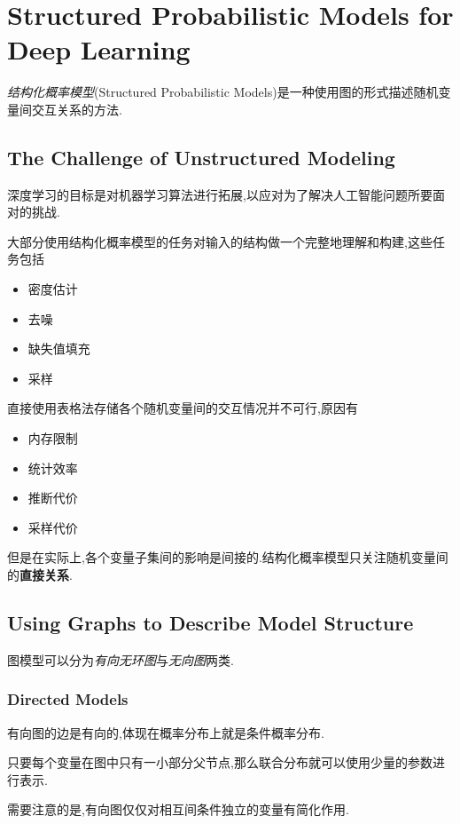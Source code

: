 \chapter{Structured Probabilistic Models for Deep Learning}

\textit{结构化概率模型}(Structured Probabilistic Models)是一种使用图的形式描述随机变量间交互关系的方法.

\section{The Challenge of Unstructured Modeling}

深度学习的目标是对机器学习算法进行拓展,以应对为了解决人工智能问题所要面对的挑战.

大部分使用结构化概率模型的任务对输入的结构做一个完整地理解和构建,这些任务包括
\begin{itemize}
    \item 密度估计
    \item 去噪
    \item 缺失值填充
    \item 采样
\end{itemize}

直接使用表格法存储各个随机变量间的交互情况并不可行,原因有
\begin{itemize}
    \item 内存限制
    \item 统计效率
    \item 推断代价
    \item 采样代价
\end{itemize}
但是在实际上,各个变量子集间的影响是间接的.结构化概率模型只关注随机变量间的\textbf{直接关系}.

\section{Using Graphs to Describe Model Structure}

图模型可以分为\textit{有向无环图}与\textit{无向图}两类.

\subsection{Directed Models}

有向图的边是有向的,体现在概率分布上就是条件概率分布.

只要每个变量在图中只有一小部分父节点,那么联合分布就可以使用少量的参数进行表示.

需要注意的是,有向图仅仅对相互间条件独立的变量有简化作用.